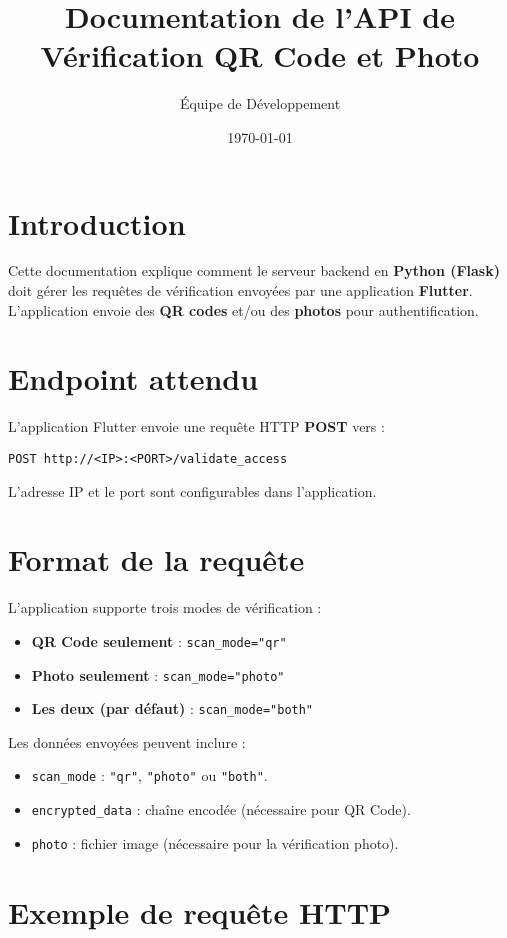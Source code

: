 \documentclass[a4paper,12pt]{article}
\title{Documentation de l'API de Vérification QR Code et Photo}
\author{Équipe de Développement}
\date{\today}
\begin{document}
\maketitle

\section{Introduction}
Cette documentation explique comment le serveur backend en \textbf{Python (Flask)} doit gérer les requêtes de vérification envoyées par une application \textbf{Flutter}. L'application envoie des \textbf{QR codes} et/ou des \textbf{photos} pour authentification.

\section{Endpoint attendu}
L'application Flutter envoie une requête HTTP \textbf{POST} vers :
\begin{verbatim}
POST http://<IP>:<PORT>/validate_access
\end{verbatim}
L'adresse IP et le port sont configurables dans l'application.

\section{Format de la requête}

L'application supporte trois modes de vérification :
\begin{itemize}
    \item \textbf{QR Code seulement} : \texttt{scan\_mode="qr"}
    \item \textbf{Photo seulement} : \texttt{scan\_mode="photo"}
    \item \textbf{Les deux (par défaut)} : \texttt{scan\_mode="both"}
\end{itemize}

Les données envoyées peuvent inclure :
\begin{itemize}
    \item \texttt{scan\_mode} : \texttt{"qr"}, \texttt{"photo"} ou \texttt{"both"}.
    \item \texttt{encrypted\_data} : chaîne encodée (nécessaire pour QR Code).
    \item \texttt{photo} : fichier image (nécessaire pour la vérification photo).
\end{itemize}

\section{Exemple de requête HTTP}
\end{document}
